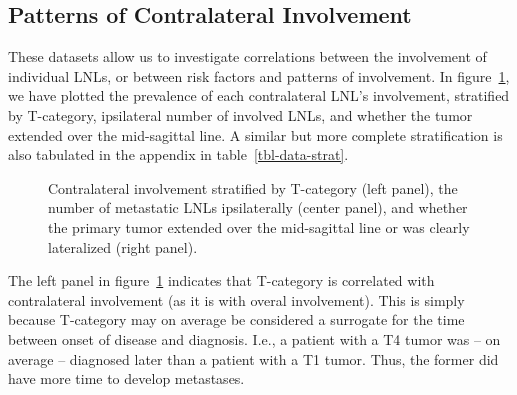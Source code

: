 \documentclass[
  sn-mathphys-num,
]{sn-jnl}
\begin{document}
\subsection{Patterns of Contralateral Involvement}\label{sec-data-strat}

These datasets allow us to investigate correlations between the
involvement of individual LNLs, or between risk factors and patterns of
involvement. In figure~\ref{fig-data-strat}, we have plotted the
prevalence of each contralateral LNL's involvement, stratified by
T-category, ipsilateral number of involved LNLs, and whether the tumor
extended over the mid-sagittal line. A similar but more complete
stratification is also tabulated in the appendix in
table~\ref{tbl-data-strat}.

\begin{figure}


\caption{\label{fig-data-strat}Contralateral involvement stratified by
T-category (left panel), the number of metastatic LNLs ipsilaterally
(center panel), and whether the primary tumor extended over the
mid-sagittal line or was clearly lateralized (right panel).}

\end{figure}%

The left panel in figure~\ref{fig-data-strat} indicates that T-category
is correlated with contralateral involvement (as it is with overal
involvement). This is simply because T-category may on average be
considered a surrogate for the time between onset of disease and
diagnosis. I.e., a patient with a T4 tumor was -- on average --
diagnosed later than a patient with a T1 tumor. Thus, the former did
have more time to develop metastases.
\end{document}

